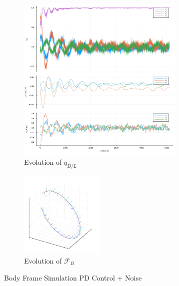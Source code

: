 \documentclass{article}
\begin{document}
\begin{figure}[H]
\centering
	\begin{subfigure}[b]{0.6\textwidth}
		\centering
		\includegraphics[width=8cm]{images/pd_noise_attitude_lvlh.png}
		\caption{Evolution of $q_{B/L}$}
		\label{fig:quat_pd_noise}
	\end{subfigure}
	\begin{subfigure}[b]{0.3\textwidth}
		\centering
		\includegraphics[width=4cm]{images/pd_noise_orbit_0s_to_5100s.png}
		\caption{Evolution of $\mathcal{F}_{B}$}
		\label{fig:orbit_pd_noise}
	\end{subfigure}
	\caption{Body Frame Simulation PD Control + Noise}
\end{figure}
\end{document}
